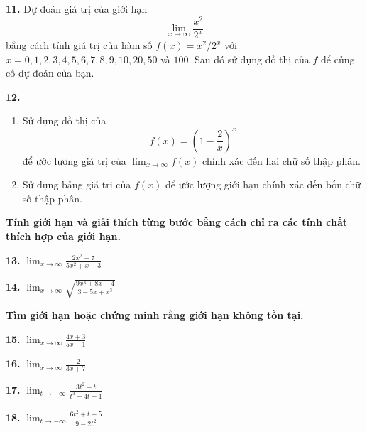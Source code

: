 \noindent
\begin{minipage}[t]{0.485\textwidth}
\raggedright

\noindent\casicon\textbf{11.} Dự đoán giá trị của giới hạn
\[
\lim_{x \to \infty} \frac{x^2}{2^x}
\]
bằng cách tính giá trị của hàm số $f(x) = x^2/2^x$ với $x = 0, 1, 2, 3, 4, 5, 6, 7, 8, 9, 10, 20, 50$ và $100$. Sau đó sử dụng đồ thị của $f$ để củng cố dự đoán của bạn.

\vspace{0.6em}

\noindent\casicon\textbf{12.} 
\begin{enumerate}[label=(\alph*), leftmargin=1.5em, itemsep=1pt, topsep=1pt, parsep=0pt]
    \item Sử dụng đồ thị của
    \[
    f(x) = \left( 1 - \frac{2}{x} \right)^x
    \]
    để ước lượng giá trị của $\lim_{x \to \infty} f(x)$ chính xác đến hai chữ số thập phân.
    \item Sử dụng bảng giá trị của $f(x)$ để ước lượng giới hạn chính xác đến bốn chữ số thập phân.
\end{enumerate}

\vspace{0.6em}

\; \textbf{Tính giới hạn và giải thích từng bước bằng cách chỉ ra các tính chất thích hợp của giới hạn.}

\vspace{0.4em}

\noindent
\parbox[t]{0.48\linewidth}{\textbf{13.} $\displaystyle \lim_{x \to \infty} \frac{2x^2 - 7}{5x^2 + x - 3}$}\hfill
\parbox[t]{0.48\linewidth}{\textbf{14.} $\displaystyle \lim_{x \to \infty} \sqrt{\frac{9x^3 + 8x - 4}{3 - 5x + x^3}}$}

\vspace{0.7em}

\; \textbf{Tìm giới hạn hoặc chứng minh rằng giới hạn không tồn tại.}

\vspace{0.4em}

\noindent
\parbox[t]{0.48\linewidth}{\textbf{15.} $\displaystyle \lim_{x \to \infty} \frac{4x + 3}{5x - 1}$}\hfill
\parbox[t]{0.48\linewidth}{\textbf{16.} $\displaystyle \lim_{x \to \infty} \frac{-2}{3x + 7}$}

\vspace{0.5em}

\noindent
\parbox[t]{0.48\linewidth}{\textbf{17.} $\displaystyle \lim_{t \to -\infty} \frac{3t^2 + t}{t^3 - 4t + 1}$}\hfill
\parbox[t]{0.48\linewidth}{\textbf{18.} $\displaystyle \lim_{t \to -\infty} \frac{6t^2 + t - 5}{9 - 2t^2}$}


\end{minipage}
